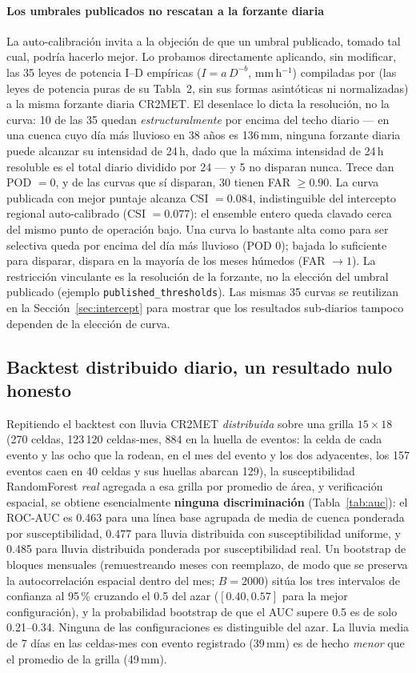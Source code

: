 \documentclass[authoryear,preprint,review,12pt]{elsarticle}
\begin{document}
\paragraph{Los umbrales publicados no rescatan a la forzante diaria}
La auto-calibración invita a la objeción de que un umbral publicado, tomado tal
cual, podría hacerlo mejor. Lo probamos directamente aplicando, sin modificar, las
35 leyes de potencia I--D empíricas ($I=a\,D^{-b}$, mm\,h$^{-1}$) compiladas por
\citet{guzzetti2007} (las leyes de potencia puras de su Tabla~2, sin sus formas asintóticas ni
normalizadas) a la
misma forzante diaria CR2MET. El desenlace lo dicta la resolución, no la curva: 10
de las 35 quedan \emph{estructuralmente} por encima del techo diario --- en una
cuenca cuyo día más lluvioso en 38 años es 136\,mm, ninguna forzante diaria puede
alcanzar su intensidad de 24\,h, dado que la máxima intensidad de 24\,h resoluble
es el total diario dividido por 24 --- y 5 no disparan nunca. Trece dan POD $=0$, y
de las curvas que sí disparan, 30 tienen FAR $\geq 0.90$. La curva publicada con
mejor puntaje alcanza CSI $=0.084$, indistinguible del intercepto regional
auto-calibrado (CSI $=0.077$): el ensemble entero queda clavado cerca del mismo
punto de operación bajo. Una curva lo bastante alta como para ser selectiva queda
por encima del día más lluvioso (POD $0$); bajada lo suficiente para disparar,
dispara en la mayoría de los meses húmedos (FAR $\to 1$). La restricción
vinculante es la resolución de la forzante, no la elección del umbral publicado
(ejemplo \texttt{published\_thresholds}). Las mismas 35 curvas se reutilizan en la
Sección~\ref{sec:intercept} para mostrar que los resultados sub-diarios tampoco
dependen de la elección de curva.

\subsection{Backtest distribuido diario, un resultado nulo honesto}

Repitiendo el backtest con lluvia CR2MET \emph{distribuida} sobre una grilla
$15\times18$ (270 celdas, 123\,120 celdas-mes, 884 en la huella de eventos: la celda
de cada evento y las ocho que la rodean, en el mes del evento y los dos adyacentes, los
157 eventos caen en 40 celdas y sus huellas abarcan 129), la
susceptibilidad RandomForest \emph{real} agregada a esa grilla por promedio de área, y verificación
espacial, se obtiene esencialmente \textbf{ninguna discriminación}
(Tabla~\ref{tab:auc}): el ROC-AUC es 0.463 para una línea base agrupada de media de
cuenca ponderada por susceptibilidad, 0.477 para lluvia distribuida con
susceptibilidad uniforme, y 0.485 para lluvia distribuida ponderada por
susceptibilidad real. Un bootstrap de bloques mensuales (remuestreando meses con
reemplazo, de modo que se preserva la autocorrelación espacial dentro del mes;
$B=2000$) sitúa los tres intervalos de confianza al 95\,\% cruzando el 0.5 del azar
($[0.40, 0.57]$ para la mejor configuración), y la probabilidad bootstrap de que el
AUC supere 0.5 es de solo 0.21--0.34. Ninguna de las configuraciones es
distinguible del azar. La lluvia media de 7 días en las celdas-mes con evento
registrado (39\,mm) es de hecho \emph{menor} que el promedio de la grilla (49\,mm).
\end{document}
